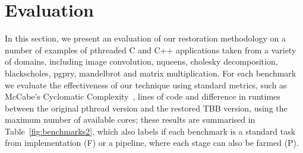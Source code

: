 %
%
%
%
%

\section{Evaluation}
\label{sec:evaluation}

In this section, we present an evaluation of our restoration methodology on a number of examples of pthreaded C and C++ applications taken from a variety of domains, including image convolution, nqueens, cholesky decomposition, blackscholes, pgpry, mandelbrot and matrix multiplication. For each benchmark we evaluate the effectiveness of our technique using standard metrics, such as McCabe's Cyclomatic Complexity~\cite{10.1109/TSE.1976.233837}, lines of code and difference in runtimes between the original pthread version and the restored TBB version, using the maximum number of available cores; these results are summarised in Table~\ref{fig:benchmarks2}, which also labels if each benchmark is a standard task from implementation (F) or a pipeline, where each stage can also be farmed (P). 

